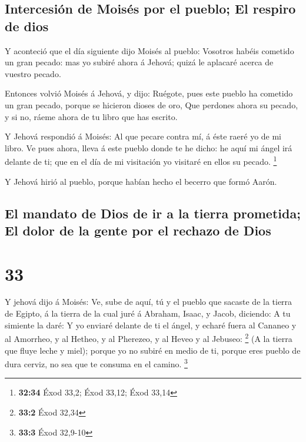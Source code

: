 \hypertarget{intercesiuxf3n-de-moisuxe9s-por-el-pueblo-el-respiro-de-dios}{%
\subsection{Intercesión de Moisés por el pueblo; El respiro de
dios}\label{intercesiuxf3n-de-moisuxe9s-por-el-pueblo-el-respiro-de-dios}}

 Y aconteció que el día siguiente dijo Moisés al pueblo:
Vosotros habéis cometido un gran pecado: mas yo subiré ahora á Jehová;
quizá le aplacaré acerca de vuestro pecado.

 Entonces volvió Moisés á Jehová, y dijo: Ruégote, pues
este pueblo ha cometido un gran pecado, porque se hicieron dioses de
oro,  Que perdones ahora su pecado, y si no, ráeme ahora de
tu libro que has escrito.

 Y Jehová respondió á Moisés: Al que pecare contra mí, á
éste raeré yo de mi libro.  Ve pues ahora, lleva á este
pueblo donde te he dicho: he aquí mi ángel irá delante de ti; que en el
día de mi visitación yo visitaré en ellos su pecado. \footnote{\textbf{32:34}
  Éxod 33,2; Éxod 33,12; Éxod 33,14}

 Y Jehová hirió al pueblo, porque habían hecho el becerro
que formó Aarón.

\hypertarget{el-mandato-de-dios-de-ir-a-la-tierra-prometida-el-dolor-de-la-gente-por-el-rechazo-de-dios}{%
\subsection{El mandato de Dios de ir a la tierra prometida; El dolor de
la gente por el rechazo de
Dios}\label{el-mandato-de-dios-de-ir-a-la-tierra-prometida-el-dolor-de-la-gente-por-el-rechazo-de-dios}}

\hypertarget{section-32}{%
\section{33}\label{section-32}}

 Y jehová dijo á Moisés: Ve, sube de aquí, tú y el pueblo
que sacaste de la tierra de Egipto, á la tierra de la cual juré á
Abraham, Isaac, y Jacob, diciendo: A tu simiente la daré:  Y
yo enviaré delante de ti el ángel, y echaré fuera al Cananeo y al
Amorrheo, y al Hetheo, y al Pherezeo, y al Heveo y al Jebuseo:
\footnote{\textbf{33:2} Éxod 32,34}  (A la tierra que fluye
leche y miel); porque yo no subiré en medio de ti, porque eres pueblo de
dura cerviz, no sea que te consuma en el camino. \footnote{\textbf{33:3}
  Éxod 32,9-10}


